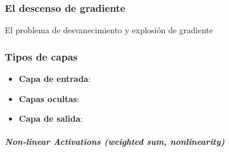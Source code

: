 \subsubsection{El descenso de gradiente \label{gradient-descent}}

El problema de desvanecimiento y explosión de gradiente





\subsubsection{Tipos de capas}


\begin{itemize}
    \item \textbf{Capa de entrada}:
    \item \textbf{Capas ocultas}:
    \item \textbf{Capa de salida}:
\end{itemize}





\paragraph*{\textit{Non-linear Activations (weighted sum, nonlinearity)} \cite{pytorch2024github}}

